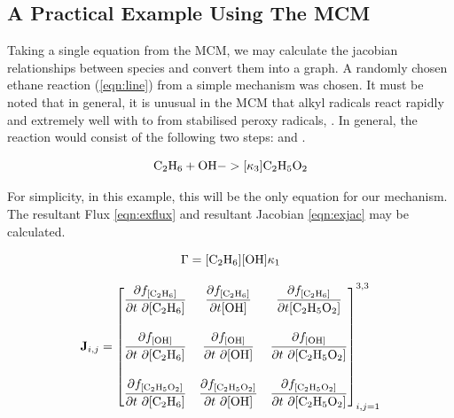\subsection{A Practical Example Using The MCM}\label{sec:jacpractical}

Taking a single equation from the MCM, we may calculate the jacobian relationships between species and convert them into a graph. A randomly chosen ethane reaction (\autoref{eqn:line}) from a simple mechanism was chosen. It must be noted that in general, it is unusual in the MCM that alkyl radicals react rapidly and extremely well with  to from stabilised peroxy radicals, \citep{mcmorigin}. In general, the reaction would consist of the following two steps:
and .

\begin{equation}
\label{eqn:line}
\ce{C2H6} + \ce{OH} ->[\kappa_3] \ce{C2H5O2}
\end{equation}

For simplicity, in this example, this will be the only equation for our mechanism. The resultant Flux \autoref{eqn:exflux} and resultant Jacobian \autoref{eqn:exjac} may be calculated.

\begin{equation}\label{eqn:exflux}
   \Gamma = [\ce{C2H6}][\ce{OH}]\kappa_1 \\[15pt]
\end{equation}

   \begin{eqnarray}
    \mathbf{J}_{i,j} =
 \begin{bmatrix}
   \dfrac{\partial f_{[\ce{C2H6}]}}{\partial t \ \partial {[\ce{C2H6}]}} &
     \dfrac{\partial f_{[\ce{C2H6}]}}{\partial t{[\ce{OH}]}} &
     \dfrac{\partial f_{[\ce{C2H6}]}}{ \partial t{[\ce{C2H5O2}]}} \\[20pt]
   \dfrac{\partial f_{[\ce{OH}]}}{\partial t \ \partial {[\ce{C2H6}]}} &
     \dfrac{\partial f_{[\ce{OH}]}}{\partial t \ \partial {[\ce{OH}]}} &
   \dfrac{\partial f_{[\ce{OH}]}}{\partial t \ \partial {[\ce{C2H5O2}]}} \\[20pt]
   \dfrac{\partial f_{[\ce{C2H5O2}]}}{\partial t \ \partial {[\ce{C2H6}]}} &
     \dfrac{\partial f_{[\ce{C2H5O2}]}}{\partial t \ \partial {[\ce{OH}]}} &
     \dfrac{\partial f_{[\ce{C2H5O2}]}}{\partial t \ \partial {[\ce{C2H5O2}]}}
 \end{bmatrix}_{i,j=1}^{3,3}
 \label{eqn:exjac}
\end{eqnarray}\\


